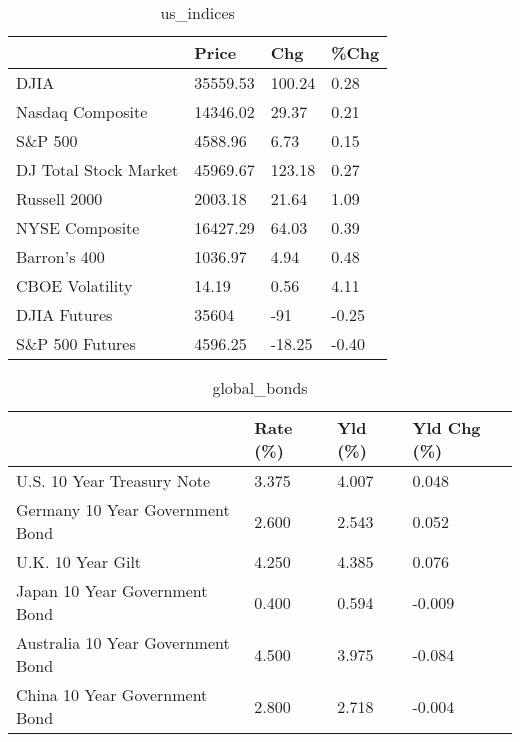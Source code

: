 \documentclass{article}%
\begin{document}
%


\begin{table}[htbp]%
\caption{us\_indices}%
\centering%
\begin{adjustbox}{width=1\textwidth}%
\begin{tabular}{llll}
\toprule
                      &    Price &    Chg &  \%Chg \\
\midrule
                 DJIA & 35559.53 & 100.24 &  0.28 \\
     Nasdaq Composite & 14346.02 &  29.37 &  0.21 \\
              S\&P 500 &  4588.96 &   6.73 &  0.15 \\
DJ Total Stock Market & 45969.67 & 123.18 &  0.27 \\
         Russell 2000 &  2003.18 &  21.64 &  1.09 \\
       NYSE Composite & 16427.29 &  64.03 &  0.39 \\
         Barron's 400 &  1036.97 &   4.94 &  0.48 \\
      CBOE Volatility &    14.19 &   0.56 &  4.11 \\
         DJIA Futures &    35604 &    -91 & -0.25 \\
      S\&P 500 Futures &  4596.25 & -18.25 & -0.40 \\
\bottomrule
\end{tabular}
%
\end{adjustbox}%
\end{table}

%


\begin{table}[htbp]%
\caption{global\_bonds}%
\centering%
\begin{adjustbox}{width=1\textwidth}%
\begin{tabular}{llll}
\toprule
                                  & Rate (\%) & Yld (\%) & Yld Chg (\%) \\
\midrule
       U.S. 10 Year Treasury Note &    3.375 &   4.007 &       0.048 \\
  Germany 10 Year Government Bond &    2.600 &   2.543 &       0.052 \\
                U.K. 10 Year Gilt &    4.250 &   4.385 &       0.076 \\
    Japan 10 Year Government Bond &    0.400 &   0.594 &      -0.009 \\
Australia 10 Year Government Bond &    4.500 &   3.975 &      -0.084 \\
    China 10 Year Government Bond &    2.800 &   2.718 &      -0.004 \\
\bottomrule
\end{tabular}
%
\end{adjustbox}%
\end{table}
\end{document}

